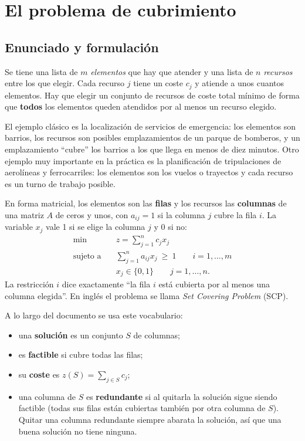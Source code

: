 \section{El problema de cubrimiento}\label{sec:problema}

\subsection{Enunciado y formulación}

Se tiene una lista de $m$ \emph{elementos} que hay que atender y una lista de $n$
\emph{recursos} entre los que elegir. Cada recurso $j$ tiene un coste $c_j$ y atiende a unos
cuantos elementos. Hay que elegir un conjunto de recursos de coste total mínimo de forma que
\textbf{todos} los elementos queden atendidos por al menos un recurso elegido.

El ejemplo clásico es la localización de servicios de emergencia: los elementos son barrios,
los recursos son posibles emplazamientos de un parque de bomberos, y un emplazamiento
``cubre'' los barrios a los que llega en menos de diez minutos. Otro ejemplo muy importante
en la práctica es la planificación de tripulaciones de aerolíneas y ferrocarriles: los
elementos son los vuelos o trayectos y cada recurso es un turno de trabajo posible.

En forma matricial, los elementos son las \textbf{filas} y los recursos las \textbf{columnas}
de una matriz $A$ de ceros y unos, con $a_{ij}=1$ si la columna $j$ cubre la fila $i$. La
variable $x_j$ vale 1 si se elige la columna $j$ y 0 si no:
\begin{equation}\label{eq:scp}
\begin{aligned}
 \min\quad & z=\sum_{j=1}^{n} c_j x_j \\
 \text{sujeto a}\quad & \sum_{j=1}^{n} a_{ij} x_j \ \ge\ 1 \qquad i=1,\dots,m \\
 & x_j\in\{0,1\} \qquad j=1,\dots,n .
\end{aligned}
\end{equation}
La restricción $i$ dice exactamente ``la fila $i$ está cubierta por al menos una columna
elegida''. En inglés el problema se llama \emph{Set Covering Problem} (SCP).

A lo largo del documento se usa este vocabulario:
\begin{itemize}
  \item una \textbf{solución} es un conjunto $S$ de columnas;
  \item es \textbf{factible} si cubre todas las filas;
  \item su \textbf{coste} es $z(S)=\sum_{j\in S} c_j$;
  \item una columna de $S$ es \textbf{redundante} si al quitarla la solución sigue siendo
        factible (todas sus filas están cubiertas también por otra columna de $S$). Quitar
        una columna redundante siempre abarata la solución, así que una buena solución no
        tiene ninguna.
\end{itemize}

